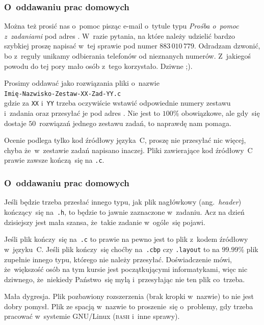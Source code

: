 \documentclass[10pt,t]{beamer}
\begin{document}
\begin{frame}
  \frametitle{O~oddawaniu prac domowych}


  Można też prosić nas o~pomoc pisząc e-mail o~tytule typu
  \textit{Prośba o~pomoc z~zadaniami} pod adres \email. W~razie pytania,
  na które należy udzielić bardzo szybkiej proszę napisać w~tej sprawie pod
  numer $883 \, 010 \, 779$. Odradzam dzwonić, bo z~reguły unikamy
  odbierania telefonów od nieznanych numerów. Z~jakiegoś powodu do tej pory
  mało osób z~tego korzystało. Dziwne ;).

  Prosimy oddawać jako rozwiązania pliki o~nazwie \\
  \texttt{Imię-Nazwisko-Zestaw-XX-Zad-YY.c} \\
  gdzie za \texttt{XX} i~\texttt{YY} trzeba oczywiście wstawić odpowiednie
  numery zestawu i~zadania oraz przesyłać je pod adres \email. Nie jest to
  $100$\% obowiązkowe, ale gdy~się dostaje $50$~rozwiązań jednego zestawu
  zadań, to naprawdę nam pomaga.

  Ocenie podlega tylko kod źródłowy języka~C, proszę nie przesyłać nic
  więcej, chyba że~w~zestawie zadań napisano inaczej. Pliki zawierające
  kod źródłowy~C prawie zawsze kończą~się na \texttt{.c}.

\end{frame}





\begin{frame}
  \frametitle{O~oddawaniu prac domowych}


  Jeśli będzie trzeba przesłać innego typu, jak plik nagłówkowy
  (ang.~\textit{header}) kończący~się na~\texttt{.h}, to będzie to jawnie
  zaznaczone w~zadaniu. Acz na dzień dzisiejszy jest mała szansa, że~takie
  zadanie w~ogóle~się pojawi.

  Jeśli plik kończy~się na~\texttt{.c} to prawie na pewno jest to plik
  z~kodem źródłowy w~języku~C. Jeśli plik kończy~się choćby
  na~\texttt{.cbp} czy \texttt{.layout} to na $99.99$\% plik zupełnie
  innego typu, którego nie należy przesyłać. Doświadczenie mówi,
  że~większość osób na tym kursie jest początkującymi informatykami, więc
  nic dziwnego, że~niekiedy Państwo~się mylą i~przesyłając nie ten plik
  co~trzeba.

  Mała dygresja. Plik pozbawiony rozszerzenia (brak kropki w~nazwie) to
  nie jest dobry pomysł. Plik ze spacją w~nazwie to proszenie~się
  o~problemy, gdy trzeba pracować w~systemie GNU/Linux (\textsc{bash}
  i~inne sprawy).

\end{frame}
\end{document}
